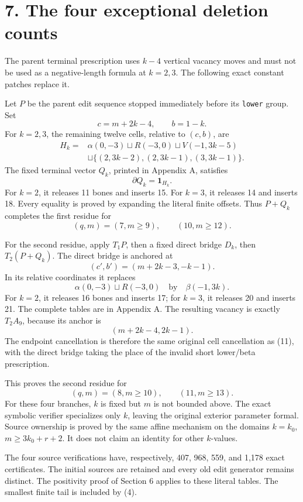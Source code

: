 \documentclass[
  11pt,
]{article}
\begin{document}
\section{7. The four exceptional deletion
counts}\label{the-four-exceptional-deletion-counts}

The parent terminal prescription uses \(k-4\) vertical vacancy moves and
must not be used as a negative-length formula at \(k=2,3\). The
following exact constant patches replace it.

Let \(P\) be the parent edit sequence stopped immediately before its
\texttt{lower} group. Set \[
 c=m+2k-4,\qquad b=1-k.
\] For \(k=2,3\), the remaining twelve cells, relative to \((c,b)\), are
\[
\begin{split}
 H_k={}&\alpha(0,-3)\sqcup R(-3,0)\sqcup V(-1,3k-5)\\
 &\sqcup\{(2,3k-2),(2,3k-1),(3,3k-1)\}.
\end{split}\tag{14}
\] The fixed terminal vector \(Q_k\), printed in Appendix A, satisfies
\[
 \partial Q_k=\mathbf1_{H_k}.
\] For \(k=2\), it releases 11 bones and inserts 15. For \(k=3\), it
releases 14 and inserts 18. Every equality is proved by expanding the
literal finite offsets. Thus \(P+Q_k\) completes the first residue for
\[
 (q,m)=(7,m\ge9),\qquad(10,m\ge12).
\]

For the second residue, apply \(T_1P\), then a fixed direct bridge
\(D_k\), then \(T_2(P+Q_k)\). The direct bridge is anchored at \[
 (c',b')=(m+2k-3,-k-1).
\] In its relative coordinates it replaces \[
 \alpha(0,-3)\sqcup R(-3,0)
 \quad\text{by}\quad\beta(-1,3k).
\] For \(k=2\), it releases 16 bones and inserts 17; for \(k=3\), it
releases 20 and inserts 21. The complete tables are in Appendix A. The
resulting vacancy is exactly \(T_2A_9\), because its anchor is \[
 (m+2k-4,2k-1).
\] The endpoint cancellation is therefore the same original cell
cancellation as (11), with the direct bridge taking the place of the
invalid short lower/beta prescription.

This proves the second residue for \[
 (q,m)=(8,m\ge10),\qquad(11,m\ge13).
\] For these four branches, \(k\) is fixed but \(m\) is not bounded
above. The exact symbolic verifier specializes only \(k\), leaving the
original exterior parameter formal. Source ownership is proved by the
same affine mechanism on the domains \(k=k_0\), \(m\ge3k_0+r+2\). It
does not claim an identity for other \(k\)-values.

The four source verifications have, respectively, 407, 968, 559, and
1,178 exact certificates. The initial sources are retained and every old
edit generator remains distinct. The positivity proof of Section 6
applies to these literal tables. The smallest finite tail is included by
(4).
\end{document}
